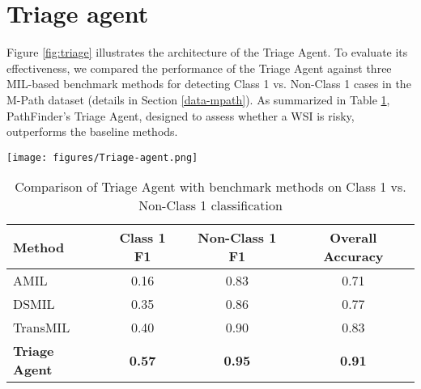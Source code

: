\clearpage
\setcounter{page}{1}
\setcounter{section}{0}  %
\setcounter{figure}{0}   %
\setcounter{table}{0}    %
\setcounter{equation}{0} %
\maketitlesupplementary




\section{Triage agent}

Figure \ref{fig:triage} illustrates the architecture of the Triage Agent. To evaluate its effectiveness, we compared the performance of the Triage Agent against three MIL-based benchmark methods \cite{ilse2018attentionbaseddeepmultipleinstance, li2021dualstreammultipleinstancelearning, shao2021transmil} for detecting Class 1 vs. Non-Class 1 cases in the M-Path dataset (details in Section \ref{data-mpath}). As summarized in Table \ref{tab:triageexperiments}, PathFinder's Triage Agent, designed to assess whether a WSI is risky, outperforms the baseline methods.

\begin{figure*}[ht]
\begin{center}
\texttt{[image: figures/Triage-agent.png]}
\end{center}
   \caption{Overview of the Triage Agent architecture. Definitions of $M$ and $H$ can be found in Section \ref{sec:methods}.}
\label{fig:triage}
\end{figure*}


\begin{table}[ht]
  \centering
  \scriptsize
  \begin{tabular}{lccc}
    \toprule
    Method & Class 1 F1 & Non-Class 1 F1 & Overall Accuracy \\
    \midrule
    AMIL \cite{ilse2018attentionbaseddeepmultipleinstance} & 0.16 & 0.83 & 0.71 \\
    DSMIL \cite{li2021dualstreammultipleinstancelearning} & 0.35 & 0.86 & 0.77 \\
    TransMIL \cite{shao2021transmil} & 0.40 & 0.90 & 0.83 \\
    \midrule
    \textbf{Triage Agent} & \textbf{0.57} & \textbf{0.95} & \textbf{0.91} \\
    \bottomrule
  \end{tabular}
  \caption{Comparison of Triage Agent with benchmark methods on Class 1 vs. Non-Class 1 classification}
  \label{tab:triageexperiments}
\end{table}

